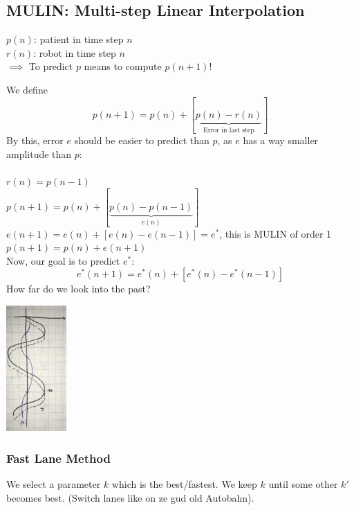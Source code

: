 \documentclass{exerciseBlue}
\begin{document}
\subsection{MULIN: Multi-step Linear Interpolation}
$p(n)$: patient in time step $n$\\
$r(n)$: robot in time step $n$\\
$\implies $ To predict $p$ means to compute $p(n+1)$!\\
\par We define
$$p(n+1) = p(n) + [\underbrace{p(n)-r(n)}_{\text{Error in last step}}]$$
By this, error $e$ should be easier to predict than $p$, as $e$ has a way smaller amplitude than $p$:\\\\
$r(n) = p(n-1)$\\
$p(n+1) = p(n) + [\underbrace{p(n)-p(n-1)}_{e(n)}]$\\
$e(n+1) = e(n)+[e(n)-e(n-1)] = e^*$, this is MULIN of order 1\\
$p(n+1)=p(n)+e(n+1)$\\
Now, our goal is to predict $e^*$:
$$e^*(n+1) = e^*(n)+[e^*(n)-e^*(n-1)]$$
How far do we look into the past?
\begin{center}
	\includegraphics[height = 4.8cm]{Images/MULIN1}
\end{center}
\subsubsection{Fast Lane Method}
We select a parameter $k$ which is the best/fastest. We keep $k$ until some other $k'$ becomes best. (Switch lanes like on ze gud old Autobahn).
\newpage
\end{document}
